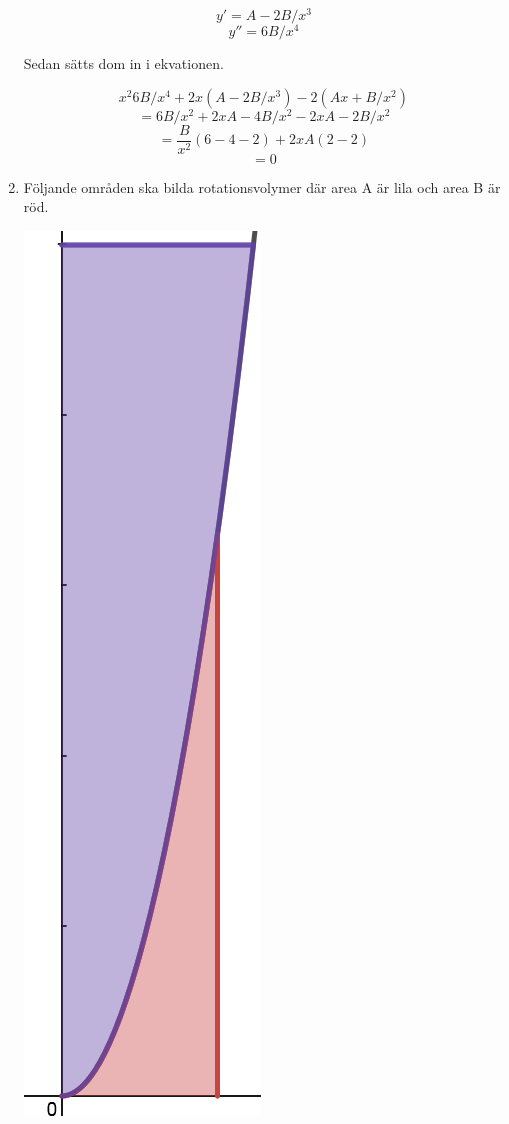 \documentclass[a4paper,12pt]{article}
\begin{document}
\begin{enumerate}
    $$y'=A-2B/x^3$$
    $$y''=6B/x^4$$

    Sedan sätts dom in i ekvationen.

    $$x^2 6B/x^4+2x(A-2B/x^3)-2(Ax+B/x^2)$$
    $$=6B/x^2+2xA-4B/x^2-2xA-2B/x^2$$
    $$=\frac{B}{x^2}(6-4-2)+2xA(2-2)$$
    $$=0$$
    
    \item Följande områden ska bilda rotationsvolymer där area A är lila
    och area B är röd. 
    \begin{center}
        \includegraphics[scale=0.4]{Figur 6.png}
    \end{center}


\end{enumerate}
\end{document}
